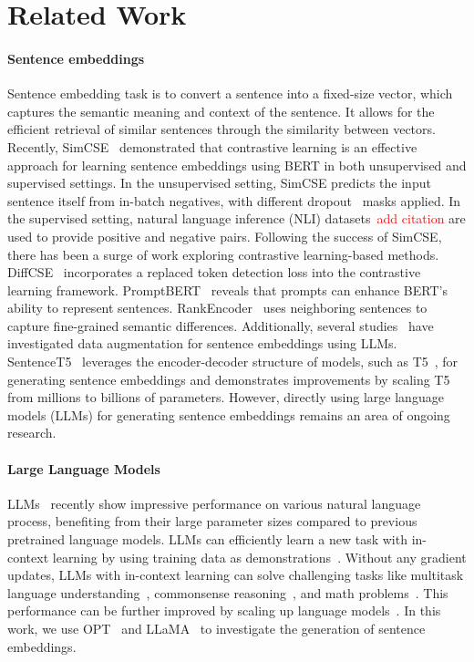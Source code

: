 \documentclass{article}
\begin{document}
\section{Related Work}

\paragraph{Sentence embeddings}
Sentence embedding task is to convert a sentence into a fixed-size vector, which captures the semantic meaning and context of the sentence. 
It allows for the efficient retrieval of similar sentences through the similarity between vectors.
Recently, SimCSE~\cite{gao2021simcse} demonstrated that contrastive learning is an effective approach for learning sentence embeddings using BERT in both unsupervised and supervised settings. In the unsupervised setting, SimCSE predicts the input sentence itself from in-batch negatives, with different dropout~\cite{srivastava2014dropout} masks applied.
In the supervised setting, natural language inference (NLI) datasets~\textcolor{red}{add citation} are used to provide positive and negative pairs.
Following the success of SimCSE, there has been a surge of work exploring contrastive learning-based methods. DiffCSE~\cite{chuang2022diffcse} incorporates a replaced token detection loss into the contrastive learning framework. PromptBERT~\cite{jiang2022promptbert} reveals that prompts can enhance BERT's ability to represent sentences. RankEncoder~\cite{seonwoo2022ranking} uses neighboring sentences to capture fine-grained semantic differences. Additionally, several studies~\cite{cheng2023improving, zhang2023contrastive} have investigated data augmentation for sentence embeddings using LLMs.
SentenceT5~\cite{sentencet5} leverages the encoder-decoder structure of models, such as T5~\cite{raffel2020exploring}, for generating sentence embeddings and demonstrates improvements by scaling T5 from millions to billions of parameters. However, directly using large language models (LLMs) for generating sentence embeddings remains an area of ongoing research.

\paragraph{Large Language Models}
LLMs~\cite{zhang2022opt,bloom,chowdhery2022palm,touvron2023llama} recently show impressive performance on various natural language process, benefiting from their large parameter sizes compared to previous pretrained language models.
LLMs can efficiently learn a new task with in-context learning by using training data as demonstrations~\cite{gpt3}.
Without any gradient updates, LLMs with in-context learning can solve challenging tasks like multitask language understanding~\cite{hendrycks2020measuring}, commonsense reasoning~\cite{lin2021truthfulqa}, and math problems~\cite{cobbe2021training}.
This performance can be further improved by scaling up language models~\cite{hoffmann2022training, kaplan2020scaling}.
In this work, we use OPT~\cite{zhang2022opt} and LLaMA~\cite{touvron2023llama} to investigate the generation of sentence embeddings.
\end{document}
